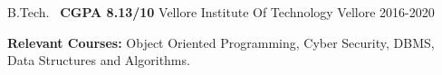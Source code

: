 \begin{cventries}
  \cventry
    { B.Tech. \textbar\ \textbf{CGPA 8.13/10} }
    { Vellore Institute Of Technology }
    { Vellore }
    { 2016-2020 }
    {
      \begin{cvitems}
        \item {\textbf{Relevant Courses:} Object Oriented Programming, Cyber Security, DBMS, Data Structures and Algorithms.}
      \end{cvitems}
    }
\end{cventries}
